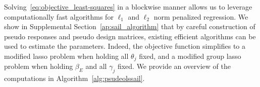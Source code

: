 \documentclass[12pt,letter]{article}\usepackage[]{graphicx}\usepackage[]{color}
\makeatletter
\newcommand{\tm}[1]{\textrm{{#1}}}
\newcommand{\btheta}{\boldsymbol{\theta}}
\newcommand{\bPsi}{\boldsymbol{\Psi}}
\DeclarePairedDelimiter\norm{\lVert}{\rVert}%
\let\oldnorm\norm
\def\norm{\@ifstar{\oldnorm}{\oldnorm*}}
\makeatother
\begin{document}
Solving~\eqref{eq:objective_least-squares} in a blockwise manner allows us to leverage computationally fast algorithms for $\ell_1$ and $\ell_2$ norm penalized regression.
We show in Supplemental Section~\ref{ap:sail_algorithm} that by careful construction of pseudo responses and pseudo design matrices, existing efficient algorithms can be used to estimate the parameters.
Indeed, the objective function simplifies to a modified lasso problem when holding all $\theta_j$ fixed, and a modified group lasso problem when holding $\beta_E$ and all $\gamma_j$ fixed.
We provide an overview of the computations in Algorithm~\ref{alg:psudeolssail}. %

\end{document}
